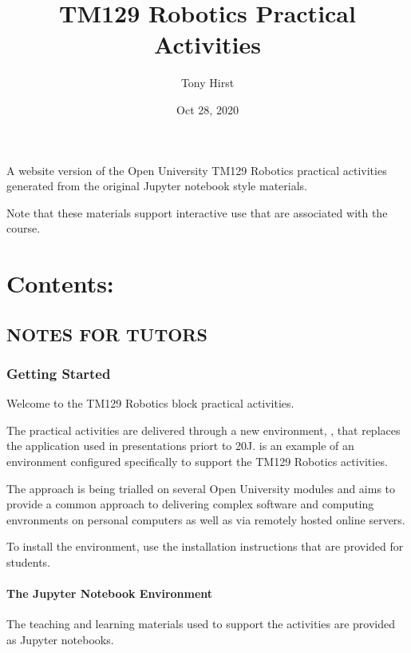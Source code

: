 \documentclass[letterpaper,10pt,english]{sphinxmanual}
\title{TM129 Robotics Practical Activities}
\date{Oct 28, 2020}
\author{Tony Hirst}
\begin{document}
\pagestyle{empty}
\sphinxmaketitle
\pagestyle{plain}
\sphinxtableofcontents
\pagestyle{normal}
\label{\detokenize{index::doc}}


A website version of the Open University TM129 Robotics practical activities generated
from the original Jupyter notebook style materials.

Note that these materials  support interactive use that are associated with the course.


\chapter{Contents:}
\label{\detokenize{index:contents}}

\section{NOTES FOR TUTORS}
\label{\detokenize{index:notes-for-tutors}}

\subsection{Getting Started}
\label{\detokenize{content/00_NOTES_FOR_TUTORS/GETTING_STARTED:Getting-Started}}\label{\detokenize{content/00_NOTES_FOR_TUTORS/GETTING_STARTED::doc}}
Welcome to the TM129 Robotics block practical activities.

The practical activities are delivered through a new environment, , that replaces the  application used in presentations priort to 20J.  is an example of an  environment configured specifically to support the TM129 Robotics activities.

The  approach is being trialled on several Open University modules and aims to provide a common approach to delivering complex software and computing envronments on personal computers as well as via remotely hosted online servers.

To install the environment, use the installation instructions that are provided for students.


\subsubsection{The Jupyter Notebook Environment}
\label{\detokenize{content/00_NOTES_FOR_TUTORS/GETTING_STARTED:The-Jupyter-Notebook-Environment}}
The teaching and learning materials used to support the activities are provided as Jupyter notebooks.
\end{document}
